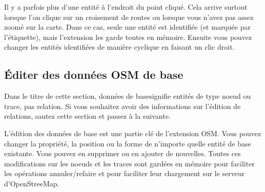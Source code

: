Il y a parfois plus d'une entité à l'endroit du point cliqué. Cela arrive surtout lorsque l'on clique sur un croisement de routes ou lorsque vous n'avez pas assez zoomé sur la carte. Dans ce cas, seule une entité est identifiée (et marquée par l'étiquette), mais l'extension les garde toutes en mémoire. Ensuite vous pouvez changer les entités identifiées de manière cyclique en faisant un clic droit.

\subsection{Éditer des données OSM de base}

Dans le titre de cette section, \og données de base\fg signifie entités de type noeud ou trace, pas relation. Si vous souhaitez avoir des informations sur l'édition de relations, sautez cette section et passez à la suivante.
 
L'édition des données de base est une partie clé de l'extension OSM. Vous pouvez changer la propriété, la position ou la forme de n'importe quelle entité de base existante. Vous pouvez en supprimer ou en ajouter de nouvelles. Toutes ces modifications sur les noeuds et les traces sont gardées en mémoire pour faciliter les opérations annuler/refaire et pour faciliter leur chargement sur le serveur d'OpenStreeMap.


